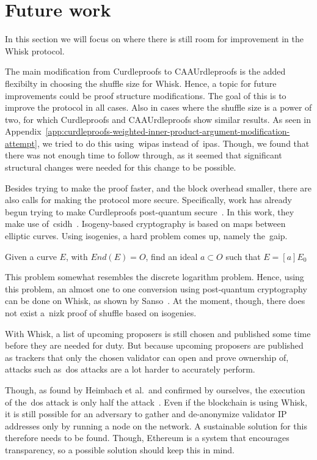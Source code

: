 \section{Future work}\label{sec:future-works}
In this section we will focus on where there is still room for improvement in the Whisk protocol.

The main modification from Curdleproofs to CAAUrdleproofs is the added flexibilty in choosing the shuffle size for Whisk.
Hence, a topic for future improvements could be proof structure modifications.
The goal of this is to improve the protocol in all cases.
Also in cases where the shuffle size is a power of two, for which Curdleproofs and CAAUrdleproofs show similar results.
As seen in Appendix~\ref{app:curdleproofs-weighted-inner-product-argument-modification-attempt}, we tried to do this using~\glspl{wipa} instead of~\glspl{ipa}.
Though, we found that there was not enough time to follow through, as it seemed that significant structural changes were needed for this change to be possible.


Besides trying to make the proof faster, and the block overhead smaller, there are also calls for making the protocol more secure.
Specifically, work has already begun trying to make Curdleproofs post-quantum secure~\cite{pqwhisk}.
In this work, they make use of~\gls{csidh}~\cite{10.1007/978-3-030-03332-3_15}.
Isogeny-based cryptography is based on maps between elliptic curves.
Using isogenies, a hard problem comes up, namely the~\gls{gaip}.
\begin{definition}
    Given a curve $E$, with $End(E)=O$, find an ideal $a\subset O$ such that $E=[a]E_0$
\end{definition}
This problem somewhat resembles the discrete logarithm problem.
Hence, using this problem, an almost one to one conversion using post-quantum cryptography can be done on Whisk, as shown by Sanso~\cite{pqwhisk}.
At the moment, though, there does not exist a~\gls{nizk} proof of shuffle based on isogenies.


With Whisk, a list of upcoming proposers is still chosen and published some time before they are needed for duty.
But because upcoming proposers are published as trackers that only the chosen validator can open and prove ownership of, attacks such as~\gls{dos} attacks are a lot harder to accurately perform.

Though, as found by Heimbach et al.~and confirmed by ourselves, the execution of the~\gls{dos} attack is only half the attack~\cite{heimbach2024deanonymizingethereumvalidatorsp2p,ouroldpaper}.
Even if the blockchain is using Whisk, it is still possible for an adversary to gather and de-anonymize validator IP addresses only by running a node on the network.
A sustainable solution for this therefore needs to be found.
Though, Ethereum is a system that encourages transparency, so a possible solution should keep this in mind.
